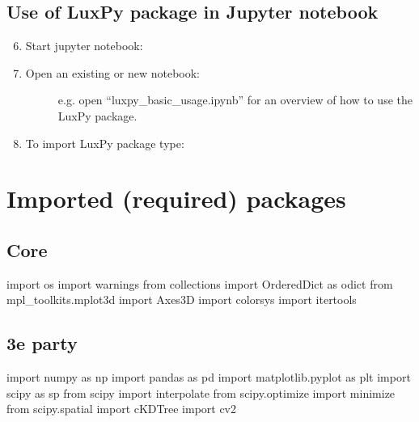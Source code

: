 \documentclass[letterpaper,10pt,english]{sphinxmanual}
\begin{document}
\section{Use of LuxPy package in Jupyter notebook}
\label{\detokenize{installation:use-of-luxpy-package-in-jupyter-notebook}}\begin{enumerate}
\setcounter{enumi}{5}
\item {} 
Start jupyter notebook:
\begin{quote}

\end{quote}

\item {} \begin{description}
\item[{Open an existing or new notebook:}] \leavevmode
e.g. open “luxpy\_basic\_usage.ipynb” for an overview of how to use the LuxPy package.

\end{description}

\item {} 
To import LuxPy package type:
\begin{quote}

\end{quote}

\end{enumerate}


\chapter{Imported (required) packages}
\label{\detokenize{required_packages::doc}}\label{\detokenize{required_packages:imported-required-packages}}

\section{Core}
\label{\detokenize{required_packages:core}}
import os
import warnings
from collections import OrderedDict as odict
from mpl\_toolkits.mplot3d import Axes3D
import colorsys
import itertools


\section{3e party}
\label{\detokenize{required_packages:e-party}}
import numpy as np
import pandas as pd
import matplotlib.pyplot as plt
import scipy as sp
from scipy import interpolate
from scipy.optimize import minimize
from scipy.spatial import cKDTree
import cv2
\end{document}

